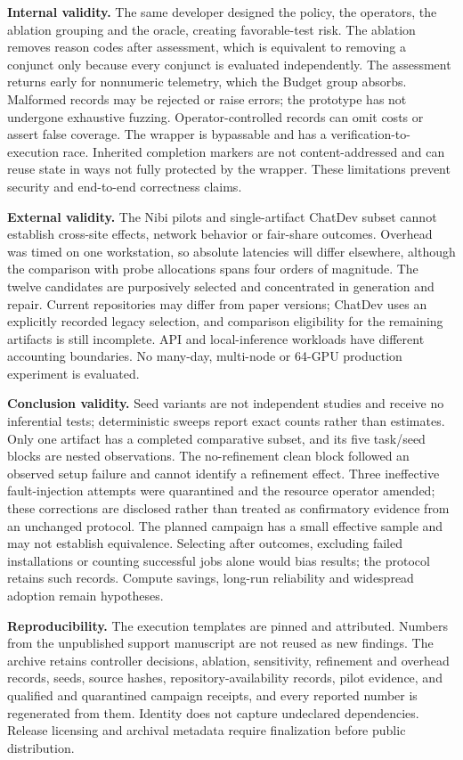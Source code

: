\documentclass[pdflatex,sn-mathphys-num]{sn-jnl}
\theoremstyle{thmstylethree}
\begin{document}
\textbf{Internal validity.} The same developer designed the policy, the operators, the ablation grouping and the oracle, creating favorable-test risk. The ablation removes reason codes after assessment, which is equivalent to removing a conjunct only because every conjunct is evaluated independently. The assessment returns early for nonnumeric telemetry, which the Budget group absorbs. Malformed records may be rejected or raise errors; the prototype has not undergone exhaustive fuzzing. Operator-controlled records can omit costs or assert false coverage. The wrapper is bypassable and has a verification-to-execution race. Inherited completion markers are not content-addressed and can reuse state in ways not fully protected by the wrapper. These limitations prevent security and end-to-end correctness claims.

\textbf{External validity.} The Nibi pilots and single-artifact ChatDev subset cannot establish cross-site effects, network behavior or fair-share outcomes. Overhead was timed on one workstation, so absolute latencies will differ elsewhere, although the comparison with probe allocations spans four orders of magnitude. The twelve candidates are purposively selected and concentrated in generation and repair. Current repositories may differ from paper versions; ChatDev uses an explicitly recorded legacy selection, and comparison eligibility for the remaining artifacts is still incomplete. API and local-inference workloads have different accounting boundaries. No many-day, multi-node or 64-GPU production experiment is evaluated.

\textbf{Conclusion validity.} Seed variants are not independent studies and receive no inferential tests; deterministic sweeps report exact counts rather than estimates. Only one artifact has a completed comparative subset, and its five task/seed blocks are nested observations. The no-refinement clean block followed an observed setup failure and cannot identify a refinement effect. Three ineffective fault-injection attempts were quarantined and the resource operator amended; these corrections are disclosed rather than treated as confirmatory evidence from an unchanged protocol. The planned campaign has a small effective sample and may not establish equivalence. Selecting after outcomes, excluding failed installations or counting successful jobs alone would bias results; the protocol retains such records. Compute savings, long-run reliability and widespread adoption remain hypotheses.

\textbf{Reproducibility.} The execution templates are pinned and attributed. Numbers from the unpublished support manuscript are not reused as new findings. The archive retains controller decisions, ablation, sensitivity, refinement and overhead records, seeds, source hashes, repository-availability records, pilot evidence, and qualified and quarantined campaign receipts, and every reported number is regenerated from them. Identity does not capture undeclared dependencies. Release licensing and archival metadata require finalization before public distribution.
\end{document}
